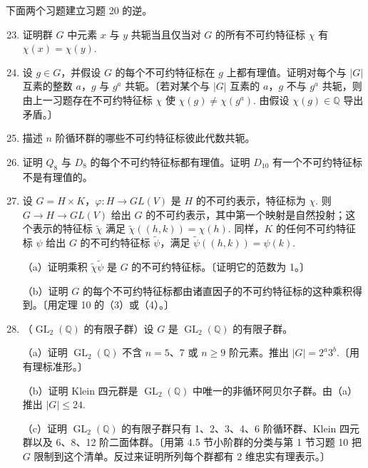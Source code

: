 下面两个习题建立习题 20 的逆。

\begin{enumerate}
\setcounter{enumi}{22}
\item 证明群 \(G\) 中元素 \(x\) 与 \(y\) 共轭当且仅当对 \(G\) 的所有不可约特征标 \(\chi\) 有 \(\chi(x) = \chi(y)\).

\item 设 \(g \in G\)，并假设 \(G\) 的每个不可约特征标在 \(g\) 上都有理值。证明对每个与 \(|G|\) 互素的整数 \(a\)，\(g\) 与 \(g^a\) 共轭。〔若对某个与 \(|G|\) 互素的 \(a\)，\(g\) 不与 \(g^a\) 共轭，则由上一习题存在不可约特征标 \(\chi\) 使 \(\chi(g) \neq \chi(g^a)\). 由假设 \(\chi(g) \in \mathbb{Q}\) 导出矛盾。〕

\item 描述 \(n\) 阶循环群的哪些不可约特征标彼此代数共轭。

\item 证明 \(Q_8\) 与 \(D_8\) 的每个不可约特征标都有理值。证明 \(D_{10}\) 有一个不可约特征标不是有理值的。

\item 设 \(G = H \times K\)，\(\varphi : H \to GL(V)\) 是 \(H\) 的不可约表示，特征标为 \(\chi\). 则 \(G \to H \to GL(V)\) 给出 \(G\) 的不可约表示，其中第一个映射是自然投射；这个表示的特征标 \(\tilde\chi\) 满足 \(\tilde\chi((h, k)) = \chi(h)\). 同样，\(K\) 的任何不可约特征标 \(\psi\) 给出 \(G\) 的不可约特征标 \(\tilde\psi\)，满足 \(\tilde\psi((h, k)) = \psi(k)\).

（a）证明乘积 \(\tilde\chi\tilde\psi\) 是 \(G\) 的不可约特征标。〔证明它的范数为 1。〕

（b）证明 \(G\) 的每个不可约特征标都由诸直因子的不可约特征标的这种乘积得到。〔用定理 10 的（3）或（4）。〕

\item （\(\operatorname{GL}_2(\mathbb{Q})\) 的有限子群）设 \(G\) 是 \(\operatorname{GL}_2(\mathbb{Q})\) 的有限子群。

（a）证明 \(\operatorname{GL}_2(\mathbb{Q})\) 不含 \(n = 5\)、7 或 \(n \geq 9\) 阶元素。推出 \(|G| = 2^a3^b\).〔用有理标准形。〕

（b）证明 Klein 四元群是 \(\operatorname{GL}_2(\mathbb{Q})\) 中唯一的非循环阿贝尔子群。由（a）推出 \(|G| \leq 24\).

（c）证明 \(\operatorname{GL}_2(\mathbb{Q})\) 的有限子群只有 1、2、3、4、6 阶循环群、Klein 四元群以及 6、8、12 阶二面体群。〔用第 4.5 节小阶群的分类与第 1 节习题 10 把 \(G\) 限制到这个清单。反过来证明所列每个群都有 2 维忠实有理表示。〕
\end{enumerate}
